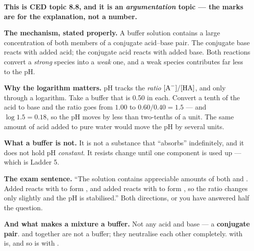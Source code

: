 \documentclass{apchem-worksheet}
\begin{document}
\begin{center}
\end{center}

\begin{workedexample}
\textbf{This is CED topic 8.8, and it is an \emph{argumentation} topic
--- the marks are for the explanation, not a number.}

\textbf{The mechanism, stated properly.} A buffer solution contains a
large concentration of both members of a conjugate acid--base pair. The
conjugate base reacts with added acid; the conjugate acid reacts with
added base. Both reactions convert a \emph{strong} species into a
\emph{weak} one, and a weak species contributes far less to the pH.

\textbf{Why the logarithm matters.} pH tracks the \emph{ratio}
$[\ce{A-}]/[\ce{HA}]$, and only through a logarithm. Take a buffer that
is \SI{0.50}{\Molar} in each. Convert a tenth of the acid to base and
the ratio goes from $1.00$ to $0.60/0.40 = 1.5$ --- and
$\log 1.5 = 0.18$, so the pH moves by less than two-tenths of a unit.
The same amount of acid added to pure water would move the pH by
several units.

\textbf{What a buffer is not.} It is not a substance that ``absorbs''
 indefinitely, and it does not hold pH \emph{constant}. It
resists change until one component is used up --- which is Ladder 5.

\textbf{The exam sentence.} ``The solution contains appreciable amounts
of both  and . Added  reacts with  to form
, and added  reacts with  to form , so the
ratio changes only slightly and the pH is stabilised.'' Both directions,
or you have answered half the question.

\textbf{And what makes a mixture a buffer.} Not any acid and base ---
a \textbf{conjugate pair}.  and  together are not a
buffer; they neutralise each other completely.  with
 is, and so is  with .
\end{workedexample}
\end{document}

